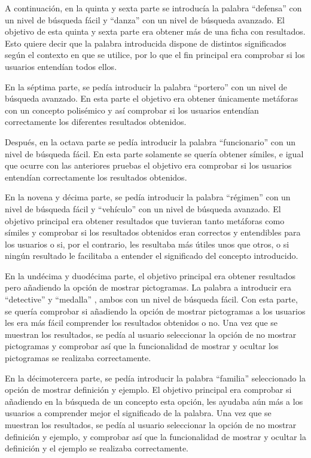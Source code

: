 A continuación, en la quinta y sexta parte se introducía la palabra ``defensa'' con un nivel de búsqueda fácil y ``danza'' con un nivel de búsqueda avanzado. El objetivo de esta quinta y sexta parte era obtener más de una ficha con resultados. Esto quiere decir que la palabra introducida dispone de distintos significados según el contexto en que se utilice, por lo que el fin principal era comprobar si los usuarios entendían todos ellos.

En la séptima parte, se pedía introducir la palabra ``portero'' con un nivel de búsqueda avanzado. En esta parte el objetivo era obtener únicamente metáforas con un concepto polisémico y así comprobar si los usuarios entendían correctamente los diferentes resultados obtenidos. 

Después, en la octava parte se pedía introducir la palabra ``funcionario'' con un nivel de búsqueda fácil. En esta parte solamente se quería obtener símiles, e igual que ocurre con las anteriores pruebas el objetivo era comprobar si los usuarios entendían correctamente los resultados obtenidos.

En la novena y décima parte, se pedía introducir la palabra ``régimen'' con un nivel de búsqueda fácil y ``vehículo'' con un nivel de búsqueda avanzado. El objetivo principal era obtener resultados que tuvieran tanto metáforas como símiles y comprobar si los resultados obtenidos eran correctos y entendibles para los usuarios o si, por el contrario, les resultaba más útiles unos que otros, o si ningún resultado le facilitaba a entender el significado del concepto introducido.

En la undécima y duodécima parte, el objetivo principal era obtener resultados pero añadiendo la opción de mostrar pictogramas. La palabra a introducir era ``detective'' y ``medalla'' , ambos con un nivel de búsqueda fácil. Con esta parte, se quería comprobar si añadiendo la opción de mostrar pictogramas a los usuarios les era más fácil comprender los resultados obtenidos o no. Una vez que se muestran los resultados, se pedía al usuario seleccionar la opción de no mostrar pictogramas y comprobar así que la funcionalidad de mostrar y ocultar los pictogramas se realizaba correctamente.

En la décimotercera parte, se pedía introducir la palabra ``familia'' seleccionado la opción de mostrar definición y ejemplo. El objetivo principal era comprobar si añadiendo en la búsqueda de un concepto esta opción, les ayudaba aún más a los usuarios a comprender mejor el significado de la palabra. Una vez que se muestran los resultados, se pedía al usuario seleccionar la opción de no mostrar definición y ejemplo, y comprobar así que la funcionalidad de mostrar y ocultar la definición y el ejemplo se realizaba correctamente.

